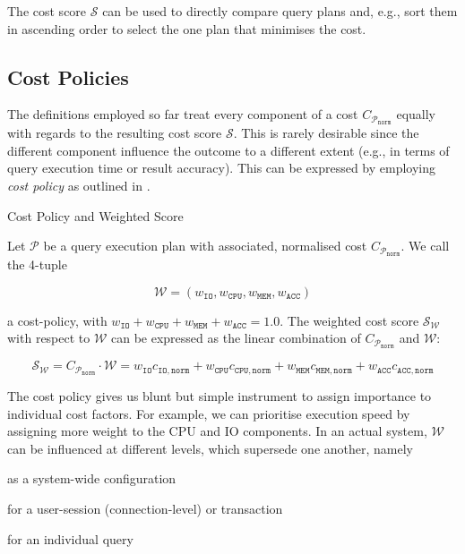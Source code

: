 The cost score $\mathcal{S}$ can be used to directly compare query plans and, e.g., sort them in ascending order to select the one plan that minimises the cost.

\subsection{Cost Policies}

The definitions employed so far treat every component of a cost $C_{\mathcal{P}_{\mathtt{norm}}}$ equally with regards to the resulting cost score $\mathcal{S}$. This is rarely desirable since the different component influence the outcome to a different extent (e.g., in terms of query execution time or result accuracy). This can be expressed by employing \emph{cost policy} as outlined in .

\begin{definition}[label=definition:cost_policy]{Cost Policy and Weighted Score}{}

    Let $\mathcal{P}$  be a query execution plan with associated, normalised cost $C_{\mathcal{P}_{\mathtt{norm}}}$. We call the 4-tuple

    \begin{equation*}
        \mathcal{W} = (w_{\mathtt{IO}}, w_{\mathtt{CPU}}, w_{\mathtt{MEM}}, w_{\mathtt{ACC}})
    \end{equation*}

    a cost-policy, with $w_{\mathtt{IO}} + w_{\mathtt{CPU}} + w_{\mathtt{MEM}} + w_{\mathtt{ACC}} = 1.0$. The weighted cost score $\mathcal{S}_{\mathcal{W}}$ with respect to $\mathcal{W}$ can be expressed as the linear combination of $C_{\mathcal{P}_{\mathtt{norm}}}$ and $\mathcal{W}$:

    \begin{equation*}
        \mathcal{S}_{\mathcal{W}} = C_{\mathcal{P}_{\mathtt{norm}}} \cdot \mathcal{W} = w_{\mathtt{IO}}c_{\mathtt{IO},\mathtt{norm}} + w_{\mathtt{CPU}} c_{\mathtt{CPU},\mathtt{norm}} + w_{\mathtt{MEM}} c_{\mathtt{MEM},\mathtt{norm}} + w_{\mathtt{ACC}} c_{\mathtt{ACC},\mathtt{norm}}
    \end{equation*}
\end{definition}

The cost policy gives us blunt but simple instrument to assign importance to individual cost factors. For example, we can prioritise execution speed by assigning more weight to the CPU and IO components. In an actual system, $\mathcal{W}$ can be influenced at different levels, which supersede one another, namely 
\begin{enumerate*}[label=(\roman*), itemjoin={{, }}, itemjoin*={{, or, }}, after={{.}}]
    \item as a system-wide configuration
    \item for a user-session (connection-level) or transaction
    \item for an individual query
\end{enumerate*}

